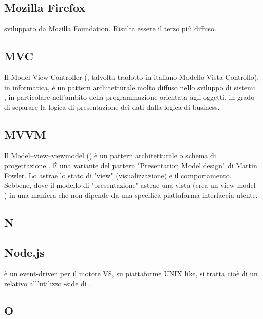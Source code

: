 \subsection{Mozilla Firefox}
   sviluppato da Mozilla Foundation. Risulta essere il terzo
 più diffuso.

\subsection{MVC}
Il Model-View-Controller (, talvolta tradotto in italiano Modello-Vista-Controllo), in informatica, è un pattern architetturale molto diffuso nello sviluppo di sistemi , in particolare nell'ambito della programmazione orientata agli oggetti, in grado di separare la logica di presentazione dei dati dalla logica di business.

\subsection{MVVM}
Il Model–view–viewmodel () è un pattern  architetturale o schema di progettazione . É una variante del pattern "Presentation Model design" di Martin Fowler. Lo  astrae lo stato di "view" (visualizzazione) e il comportamento. Sebbene, dove il modello di "presentazione" astrae una vista (crea un view model ) in una maniera che non dipende da una specifica piattaforma interfaccia utente.

\newpage

\begin{center}
\Huge\section{\uppercase{N}}
\end{center}

\subsection{Node.js}
 è un  event-driven per il motore  V8, su piattaforme UNIX
like, si tratta cioè di un  relativo all'utilizzo -side di .

\newpage

\begin{center}
\Huge\section{\uppercase{O}}
\end{center}

